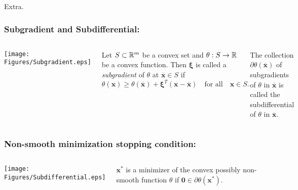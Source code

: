 
{ 
\begin{frame}[noframenumbering]
\centering
{\Huge Extra.}
\end{frame}}


{
\begin{frame}[noframenumbering]
\frametitle{Subgradient and Subdifferential:}
\begin{columns}[c] %

\centering
\texttt{[image: Figures/Subgradient.eps]}

\begin{definition} \label{Def_Subgradient}
Let $S\subset\mathbb{R}^m$ be a convex set and $\theta:S\to\mathbb{R}$ be a convex function. 
Then $\bm{\xi}$ is called a \textit{subgradient} of $\theta$ at $\overline{\bm{x}}\in S$ if
\begin{equation*}
\theta(\bm{x})\geq\theta(\overline{\bm{x}})+\bm{\xi}^T(\bm{x}-\overline{\bm{x}})\quad\text{for all}\quad\bm{x}\in S.
\end{equation*}
\end{definition}
\begin{definition} \label{Def_Subdifferential}
The collection $\partial\theta(\overline{\bm{x}})$ of subgradients of $\theta$ in $\overline{\bm{x}}$ is called the subdifferential of $\theta$ in $\overline{\bm{x}}$.
\end{definition}

\end{columns}
\end{frame}
}


{
\begin{frame}[noframenumbering]
\frametitle{Non-smooth minimization stopping condition:}
\begin{columns}[c] %

\centering
\texttt{[image: Figures/Subdifferential.eps]}

\begin{theorem}
$\bm{x}^*$ is a minimizer of the convex possibly non-smooth function $\theta$ if $\bm{0}\in\partial\theta(\bm{x}^*)$.
\end{theorem}

\end{columns}
\end{frame}
}

